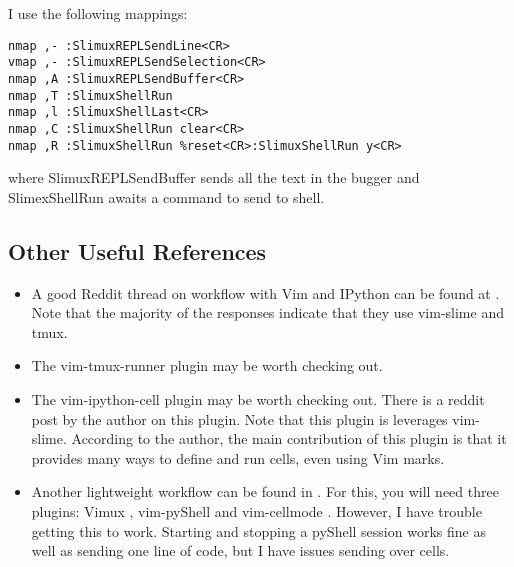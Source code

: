 \documentclass[10pt]{article}
\begin{document}
I use the following mappings:
\begin{lstlisting}
nmap ,- :SlimuxREPLSendLine<CR>
vmap ,- :SlimuxREPLSendSelection<CR>
nmap ,A :SlimuxREPLSendBuffer<CR>
nmap ,T :SlimuxShellRun 
nmap ,l :SlimuxShellLast<CR>
nmap ,C :SlimuxShellRun clear<CR>
nmap ,R :SlimuxShellRun %reset<CR>:SlimuxShellRun y<CR>
\end{lstlisting}
where SlimuxREPLSendBuffer sends all the text in the bugger and SlimexShellRun awaits a command to send to shell.

\subsection{Other Useful References}
\begin{itemize}
    \item A good Reddit thread on workflow with Vim and IPython can be found at \cite{abdeljalil732020anyone}. Note
        that the majority of the responses indicate that they use vim-slime and tmux.
    \item The vim-tmux-runner plugin \cite{toomey2013tmuxrunner} may be worth checking out. 
    \item The vim-ipython-cell plugin \cite{hanschen2019ipython} may be worth checking out. There is a reddit post
        \cite{hanschen2019reddit} by the author on this plugin. Note that this plugin is leverages vim-slime. According
        to the author, the main contribution of this plugin is that it provides many ways to define and run cells, even
        using Vim marks.
    \item Another lightweight workflow can be found in \cite{hornung2019boosting}. For this, you will need three
        plugins: Vimux \cite{benmills2009vimux}, vim-pyShell \cite{hornung2019pyShell} and vim-cellmode
        \cite{julienr2016vimcellmode}. However, I have trouble getting this to work. Starting and stopping a pyShell
        session works fine as well as sending one line of code, but I have issues sending over cells.
\end{itemize}


\nocite{*}


\end{document}
